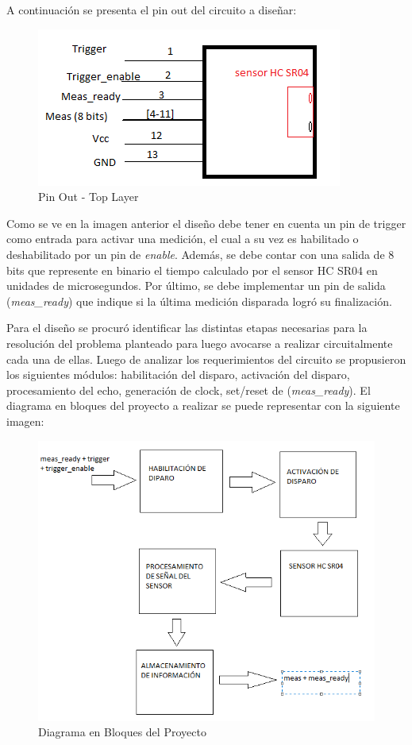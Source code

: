 A continuación se presenta el pin out del circuito a diseñar:

\begin{figure}[H]
\centering
\includegraphics[scale=0.6]{pinOutGenerico.PNG}
\caption{Pin Out - Top Layer}
\end{figure}

Como se ve en la imagen anterior el diseño debe tener en cuenta un
pin de trigger como entrada para activar una medición, el cual a su
vez es habilitado o deshabilitado por un pin de \textit{enable}. Además,
se debe contar con una salida de 8 bits que represente en binario
el tiempo calculado por el sensor HC SR04 en unidades de microsegundos.
Por último, se debe implementar un pin de salida (\textit{meas\_ready})
que indique si la última medición disparada logró su finalización. \newline

Para el diseño se procuró identificar las distintas etapas necesarias
para la resolución del problema planteado para luego avocarse a realizar
circuitalmente cada una de ellas. Luego de analizar los requerimientos
del circuito se propusieron los siguientes módulos: habilitación del
disparo, activación del disparo, procesamiento del echo, generación
de clock, set/reset de (\textit{meas\_ready}). El diagrama en bloques del
proyecto a realizar se puede representar con la siguiente imagen:

\begin{figure}[H]
\centering
\includegraphics[scale=0.5]{diagramaDeBloquesGenerico.PNG}
\caption{Diagrama en Bloques del Proyecto}
\end{figure}

